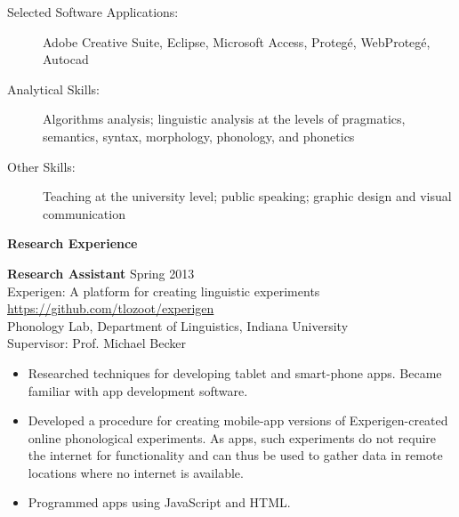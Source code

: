 \begin{singlespace}
\begin{description}
\item[Selected Software Applications:] Adobe Creative Suite, Eclipse, Microsoft Access, Proteg\'e, WebProteg\'e, Autocad
\item[Analytical Skills:] Algorithms analysis; linguistic analysis at the levels of pragmatics, semantics, syntax, morphology, phonology, and phonetics
\item[Other Skills:] Teaching at the university level; public speaking; graphic design and visual communication
\end{description}
\vspace{16pt}
\centerline{\textbf{\large Research Experience}}
\vspace{10pt}
\noindent\textbf{Research Assistant} \hfill Spring 2013 \\
\hspace{2ex} Experigen: A platform for creating linguistic experiments \\
\hspace{2ex} \url{https://github.com/tlozoot/experigen} \\
\hspace{2ex} Phonology Lab, Department of Linguistics, Indiana University \\
\hspace{2ex} Supervisor: Prof. Michael Becker
\begin{itemize} %
\item Researched techniques for developing tablet and smart-phone apps. Became familiar with app development software.
\item Developed a procedure for creating mobile-app versions of Experigen-created online phonological experiments. As apps, such experiments do not require the internet for functionality and can thus be used to gather data in remote locations where no internet is available.
\item Programmed apps using JavaScript and HTML.
\end{itemize}

\end{singlespace}
